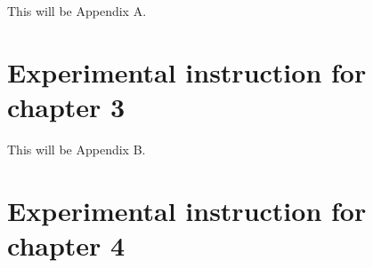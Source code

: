 \documentclass[
]{book}
\begin{document}
This will be Appendix A.

\hypertarget{experimental-instruction-for-chapter-3}{%
\chapter{Experimental instruction for chapter 3}\label{experimental-instruction-for-chapter-3}}

This will be Appendix B.

\hypertarget{experimental-instruction-for-chapter-4}{%
\chapter{Experimental instruction for chapter 4}\label{experimental-instruction-for-chapter-4}}

  
\end{document}
